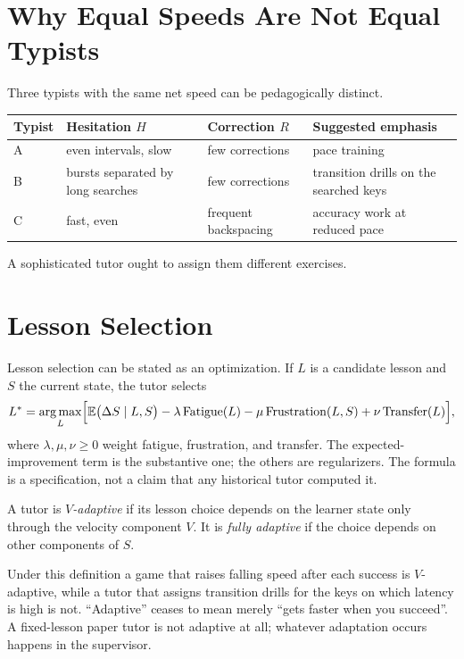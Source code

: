 \section{Why Equal Speeds Are Not Equal Typists}

Three typists with the same net speed can be pedagogically distinct.

\begin{center}
\begin{tabular}{@{}lp{3.2cm}p{3.6cm}p{3.2cm}@{}}
\toprule
Typist & Hesitation $H$ & Correction $R$ & Suggested emphasis \\
\midrule
A & even intervals, slow & few corrections & pace training \\
B & bursts separated by long searches & few corrections & transition drills on the searched keys \\
C & fast, even & frequent backspacing & accuracy work at reduced pace \\
\bottomrule
\end{tabular}
\end{center}

A sophisticated tutor ought to assign them different exercises.

\section{Lesson Selection}

Lesson selection can be stated as an optimization. If $L$ is a candidate lesson and $S$ the current state, the tutor selects
\[
L^{*}=\operatorname*{arg\,max}_{L}\Bigl[\mathbb{E}\bigl(\Delta S\mid L,S\bigr)-\lambda\operatorname{Fatigue}(L)-\mu\operatorname{Frustration}(L,S)+\nu\operatorname{Transfer}(L)\Bigr],
\]
where $\lambda,\mu,\nu\ge 0$ weight fatigue, frustration, and transfer. The expected-improvement term is the substantive one; the others are regularizers. The formula is a specification, not a claim that any historical tutor computed it.

\begin{definition}
A tutor is \emph{$V$-adaptive} if its lesson choice depends on the learner state only through the velocity component $V$. It is \emph{fully adaptive} if the choice depends on other components of $S$.
\end{definition}

Under this definition a game that raises falling speed after each success is $V$-adaptive, while a tutor that assigns transition drills for the keys on which latency is high is not. ``Adaptive'' ceases to mean merely ``gets faster when you succeed''. A fixed-lesson paper tutor is not adaptive at all; whatever adaptation occurs happens in the supervisor.

